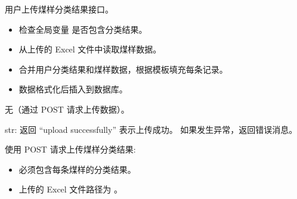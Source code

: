 \documentclass[a4paper,12pt,english]{sphinxmanual}
\begin{document}
\begin{fulllineitems}
\label{\detokenize{api/login:login.uploadUserClassifyResult}}
\pysigstartsignatures
{}
\pysigstopsignatures
\sphinxAtStartPar
用户上传煤样分类结果接口。
\begin{description}
\begin{itemize}
\item {} 
\sphinxAtStartPar
检查全局变量  是否包含分类结果。

\item {} 
\sphinxAtStartPar
从上传的 Excel 文件中读取煤样数据。

\item {} 
\sphinxAtStartPar
合并用户分类结果和煤样数据，根据模板填充每条记录。

\item {} 
\sphinxAtStartPar
数据格式化后插入到数据库。

\end{itemize}

\sphinxAtStartPar
无（通过 POST 请求上传数据）。

\sphinxAtStartPar
str: 返回 “upload successfully” 表示上传成功。
如果发生异常，返回错误消息。

\sphinxAtStartPar
使用 POST 请求上传煤样分类结果:

\begin{sphinxVerbatim}[commandchars=\\\{\}]
 
 

\end{sphinxVerbatim}

\begin{itemize}
\item {} 
\sphinxAtStartPar
{} 必须包含每条煤样的分类结果。

\item {} 
\sphinxAtStartPar
上传的 Excel 文件路径为 。


\end{itemize}
\end{description}
\end{fulllineitems}
\end{document}
